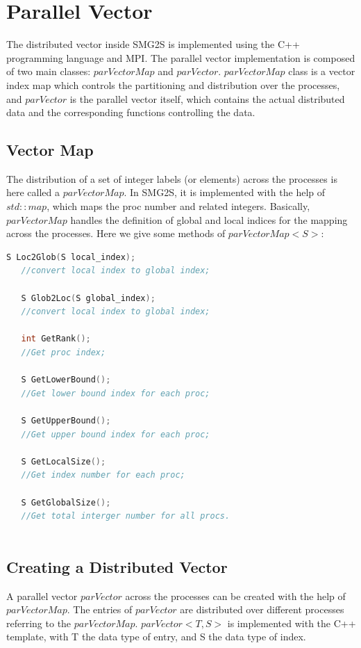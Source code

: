 \documentclass[a4paper, 10 pt]{report}
\begin{document}
	\section{Parallel Vector}
	
    The distributed vector inside SMG2S is implemented using the C++ programming language and MPI. The parallel vector implementation is composed of two main classes:     $parVectorMap$ and $parVector$. $parVectorMap$ class is a vector index map which controls the partitioning and distribution over the processes, and $parVector$ is the parallel vector itself, which contains the actual distributed data and the corresponding functions controlling the data.
	
	\subsection{Vector Map}
	
The distribution of a set of integer labels (or elements) across the processes is here called a
$parVectorMap$. In SMG2S, it is implemented with the help of $std::map$, which maps the proc number and related integers. Basically,     $parVectorMap$ handles the definition of global and local indices for the mapping across the processes. Here we give some methods of $parVectorMap<S>$:
	
		\begin{lstlisting}[language=C++,frame=single]
   S Loc2Glob(S local_index);
   //convert local index to global index;
	
   S Glob2Loc(S global_index);
   //convert local index to global index;

   int GetRank();
   //Get proc index;
   
   S GetLowerBound();
   //Get lower bound index for each proc;
  
   S GetUpperBound();
   //Get upper bound index for each proc;
   
   S GetLocalSize();
   //Get index number for each proc;
   
   S GetGlobalSize();
   //Get total interger number for all procs.
   
	\end{lstlisting}
	
	\subsection{Creating a Distributed Vector}
	
    A parallel vector $parVector$ across the processes can be created with the help of $parVectorMap$. The entries of $parVector$ are distributed over different processes referring to the $parVectorMap$. $parVector<T,S>$ is implemented with the C++ template, with T the data type of entry, and S the data type of index.  
\end{document}
